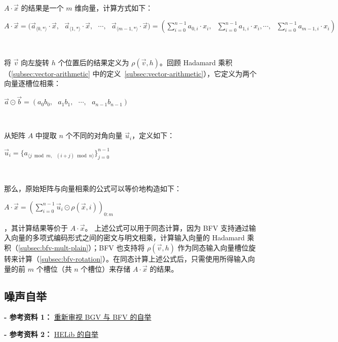 $ $

$A \cdot \vec{x}$ 的结果是一个 $m$ 维向量，计算方式如下：

$A \cdot \vec{x} = \Big(\vec{a}_{\langle 0, * \rangle} \cdot \vec{x}, \text{ } \vec{a}_{\langle 1, * \rangle} \cdot \vec{x}, \text{ }\cdots,\text{ } \vec{a}_{\langle m-1, * \rangle} \cdot \vec{x} \Big) = \left(\sum\limits_{i=0}^{n-1} a_{0, i} \cdot  x_i, \text{ } \sum\limits_{i=0}^{n-1}  a_{1, i} \cdot x_i, \cdots, \text{ } \sum\limits_{i=0}^{n-1} a_{m-1, i} \cdot x_i \right)$

$ $

将 $\vec{v}$ 向左旋转 $h$ 个位置后的结果定义为 $\rho(\vec{v}, h)$。回顾 Hadamard 乘积（\autoref{subsec:vector-arithmetic} 中的定义~\ref*{subsec:vector-arithmetic}），它定义为两个向量逐槽位相乘：

$\vec{a} \odot \vec{b} = (a_0 b_0, \text{ } a_1 b_1, \text{ } \cdots, \text{ } a_{n-1} b_{n-1})$

$ $

从矩阵 $A$ 中提取 $n$ 个不同的对角向量 $\vec{u}_i$，定义如下：

$\vec{u}_i = \{a_{\langle j \bmod m, \text{ } (i + j)\bmod n \rangle}\}_{j = 0}^{n-1}$

$ $

那么，原始矩阵与向量相乘的公式可以等价地构造如下：

$A\cdot\vec x=\left(\sum_{i=0}^{n-1}\vec u_i\odot\rho(\vec x,i)\right)_{0:m}$

，其计算结果等价于 $A \cdot \vec{x}$。
上述公式可以用于同态计算，因为 BFV 支持通过输入向量的多项式编码形式之间的密文与明文相乘，计算输入向量的 Hadamard 乘积（\autoref{subsec:bfv-mult-plain}）；BFV 也支持将 $\rho(\vec{v}, h)$ 作为同态输入向量槽位旋转来计算（\autoref{subsec:bfv-rotation}）。在同态计算上述公式后，只需使用所得输入向量的前 $m$ 个槽位（共 $n$ 个槽位）来存储 $A \cdot \vec{x}$ 的结果。



\subsection{噪声自举}
\label{subsec:bfv-bootstrapping}

\noindent \textbf{- 参考资料 1：}
\href{https://eprint.iacr.org/2022/1363.pdf}{重新审视 BGV 与 BFV 的自举}~\cite{cryptoeprint:2022/1363}


\noindent \textbf{- 参考资料 2：}
\href{https://eprint.iacr.org/2014/873.pdf}{HELib 的自举}~\cite{10.1007/s00145-020-09368-7}

